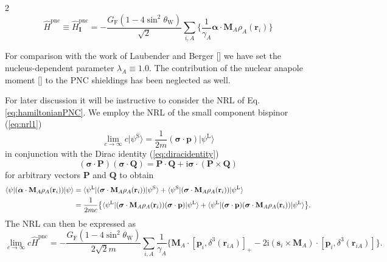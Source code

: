\documentclass[a4paper,12pt,english]{article}
\begin{document}
\begin{spacing}{2}
\begin{equation}\label{eq:hamiltonianPNC}
  \hat{H}^\text{pnc} \equiv \hat{H}^\text{pnc}_\mathbf{I} = -\frac{G_\text{F}(1-4\sin^2\theta_\text{W})}{\sqrt{2}}\sum_{i,A}\{\frac{1}{\gamma_A}\boldsymbol{\alpha}\cdot\mathbf{M}_A\rho_A(\mathbf{r}_i)\}
\end{equation}

\noindent For comparison with the work of Laubender and Berger [\cite{berger2003chemphyschem}] we have set the nucleus-dependent parameter $\lambda_A \equiv 1.0$. The contribution of the nuclear anapole moment [\cite{zeldovic1958sovphys}] to the PNC shieldings has been neglected as well.

\par For later discussion it will be instructive to consider the NRL of Eq. \ref{eq:hamiltonianPNC}. We employ the NRL of the small component bispinor (\ref{eq:nrl1})
\begin{equation}\label{eq:nrl1}
  \lim_{c\rightarrow\infty}c\vert\psi^\text{S}\rangle = \frac{1}{2m}(\boldsymbol{\sigma}\cdot\mathbf{p})\vert\psi^\text{L}\rangle
\end{equation}
in conjunction with the Dirac identity (\ref{eq:diracidentity}) 
\begin{equation}\label{eq:diracidentity}
  (\boldsymbol{\sigma}\cdot\mathbf{P})(\boldsymbol{\sigma}\cdot\mathbf{Q}) = \mathbf{P}\cdot\mathbf{Q}+\text{i}\boldsymbol{\sigma}\cdot(\mathbf{P}\times\mathbf{Q})
\end{equation}
for arbitrary vectors $\mathbf{P}$ and $\mathbf{Q}$ to obtain
\begin{align}
 \langle\psi\vert(\boldsymbol{\alpha}\cdot\mathbf{M}_A\rho_A(\mathbf{r}_i))\vert\psi\rangle &= \langle\psi^\text{L}\vert(\boldsymbol{\sigma}\cdot\mathbf{M}_A\rho_A(\mathbf{r}_i))\vert\psi^\text{S}\rangle+\langle\psi^\text{S}\vert(\boldsymbol{\sigma}\cdot\mathbf{M}_A\rho_A(\mathbf{r}_i))\vert\psi^\text{L}\rangle\\
  &= \frac{1}{2mc}\bigl\{\langle\psi^\text{L}\vert(\boldsymbol{\sigma}\cdot\mathbf{M}_A\rho_A(\mathbf{r}_i))(\boldsymbol{\sigma}\cdot\mathbf{p})\vert\psi^\text{L}\rangle+\langle\psi^\text{L}\vert(\boldsymbol{\sigma}\cdot\mathbf{p})(\boldsymbol{\sigma}\cdot\mathbf{M}_A\rho_A(\mathbf{r}_i))\vert\psi^\text{L}\rangle\bigr\}.\notag
\end{align}
The NRL can then be expressed as
\begin{equation}
  \lim_{c\rightarrow\infty}c\hat{H}^\text{pnc} = -\frac{G_\text{F}(1-4\sin^2\theta_\text{W})}{2\sqrt{2}m}\sum_{i,A}\frac{1}{\gamma_A}\bigl\{\mathbf{M}_A\cdot[\mathbf{p}_i,\delta^3(\mathbf{r}_{iA})]_+-2\text{i}(\mathbf{s}_i\times\mathbf{M}_A)\cdot[\mathbf{p}_i,\delta^3(\mathbf{r}_{iA})]\bigr\}.\label{eq:nrl2}
\end{equation}


\end{spacing}
\end{document}
